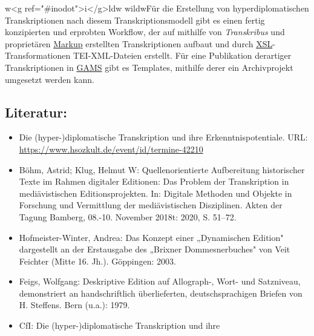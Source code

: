 \documentclass{article}
\begin{document}
        
                           w<g ref="#inodot">i</g>ldw
                        wildwFür die Erstellung von hyperdiplomatischen Transkriptionen nach diesem
                  Transkriptionsmodell gibt es einen fertig konzipierten und erprobten Workflow, der
                  auf mithilfe von \emph{Transkribus} und proprietären \href{http://gams.uni-graz.at/o:konde.126}{Markup} erstellten Transkriptionen
                  aufbaut und durch \href{http://gams.uni-graz.at/o:konde.86}{XSL}-Transformationen TEI-XML-Dateien erstellt. Für eine Publikation
                  derartiger Transkriptionen in \href{http://gams.uni-graz.at/o:konde.70}{GAMS}
                  gibt es Templates, mithilfe derer ein Archivprojekt umgesetzt werden kann.\\
            
        \subsection*{Literatur:}\begin{itemize}\item Die (hyper-)diplomatische Transkription und ihre
                              Erkenntnispotentiale. URL: \url{https://www.hsozkult.de/event/id/termine-42210}\item Böhm, Astrid; Klug, Helmut W: Quellenorientierte Aufbereitung historischer Texte im
                              Rahmen digitaler Editionen: Das Problem der Transkription in
                              mediävistischen Editionsprojekten. In: Digitale Methoden und Objekte in Forschung und Vermittlung der mediävistischen Disziplinen. Akten der Tagung Bamberg, 08.-10. November 2018t: 2020, S. 51–72.\item Hofmeister-Winter, Andrea: Das Konzept einer „Dynamischen Edition" dargestellt an
                              der Erstausgabe des „Brixner Dommesnerbuches" von Veit Feichter (Mitte
                              16. Jh.). Göppingen: 2003.\item Feigs, Wolfgang: Deskriptive Edition auf Allograph-, Wort- und
                              Satzniveau, demonstriert an handschriftlich überlieferten,
                              deutschsprachigen Briefen von H. Steffens. Bern (u.a.): 1979.\item CfI: Die (hyper-)diplomatische Transkription und ihre

\end{itemize}
\end{document}
